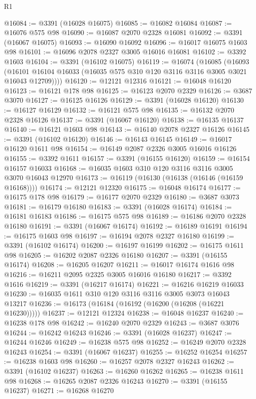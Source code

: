 \begin{lexlean}{R1}
\begin{coremodule}
@16084 := @3391 (@16028 @16075)
@16085 := @16082 @16084
@16087 := @16076 @575 @98
@16090 := @16087 @2070 @2328 @16081
@16092 := @3391 (@16067 @16075)
@16093 := @16090 @16092
@16096 := @16017 @16075 @1603 @98
@16101 := @16096 @2078 @2327 @3005 @16016 @16081
@16102 := @3392 @1603
@16104 := @3391 (@16102 @16075)
@16119 := @16074
    (@16085
      (@16093 (@16101 @16104 @16033 (@16035 @575 @310 @120 @3116 @3116 @3005 @3021 @16043 @12709))))
@16120 := @12121 @12316
@16121 := @16048 @16120
@16123 := @16121 @178 @98
@16125 := @16123 @2070 @2329
@16126 := @3687 @3070
@16127 := @16125 @16126
@16129 := @3391 (@16028 @16120)
@16130 := @16127 @16129
@16132 := @16121 @575 @98
@16135 := @16132 @2070 @2328 @16126
@16137 := @3391 (@16067 @16120)
@16138 := @16135 @16137
@16140 := @16121 @1603 @98
@16143 := @16140 @2078 @2327 @16126
@16145 := @3391 (@16102 @16120)
@16146 := @16143 @16145
@16149 := @16017 @16120 @1611 @98
@16154 := @16149 @2087 @2326 @3005 @16016 @16126
@16155 := @3392 @1611
@16157 := @3391 (@16155 @16120)
@16159 := @16154 @16157 @16033
@16168 := @16035 @1603 @310 @120 @3116 @3116 @3005 @3070 @16043 @12970
@16173 := @16119 (@16130 (@16138 (@16146 (@16159 @16168))))
@16174 := @12121 @12320
@16175 := @16048 @16174
@16177 := @16175 @178 @98
@16179 := @16177 @2070 @2329
@16180 := @3687 @3073
@16181 := @16179 @16180
@16183 := @3391 (@16028 @16174)
@16184 := @16181 @16183
@16186 := @16175 @575 @98
@16189 := @16186 @2070 @2328 @16180
@16191 := @3391 (@16067 @16174)
@16192 := @16189 @16191
@16194 := @16175 @1603 @98
@16197 := @16194 @2078 @2327 @16180
@16199 := @3391 (@16102 @16174)
@16200 := @16197 @16199
@16202 := @16175 @1611 @98
@16205 := @16202 @2087 @2326 @16180
@16207 := @3391 (@16155 @16174)
@16208 := @16205 @16207
@16211 := @16017 @16174 @1616 @98
@16216 := @16211 @2095 @2325 @3005 @16016 @16180
@16217 := @3392 @1616
@16219 := @3391 (@16217 @16174)
@16221 := @16216 @16219 @16033
@16230 := @16035 @1611 @310 @120 @3116 @3116 @3005 @3073 @16043 @13217
@16236 := @16173 (@16184 (@16192 (@16200 (@16208 (@16221 @16230)))))
@16237 := @12121 @12324
@16238 := @16048 @16237
@16240 := @16238 @178 @98
@16242 := @16240 @2070 @2329
@16243 := @3687 @3076
@16244 := @16242 @16243
@16246 := @3391 (@16028 @16237)
@16247 := @16244 @16246
@16249 := @16238 @575 @98
@16252 := @16249 @2070 @2328 @16243
@16254 := @3391 (@16067 @16237)
@16255 := @16252 @16254
@16257 := @16238 @1603 @98
@16260 := @16257 @2078 @2327 @16243
@16262 := @3391 (@16102 @16237)
@16263 := @16260 @16262
@16265 := @16238 @1611 @98
@16268 := @16265 @2087 @2326 @16243
@16270 := @3391 (@16155 @16237)
@16271 := @16268 @16270

\end{coremodule}
\end{lexlean}
